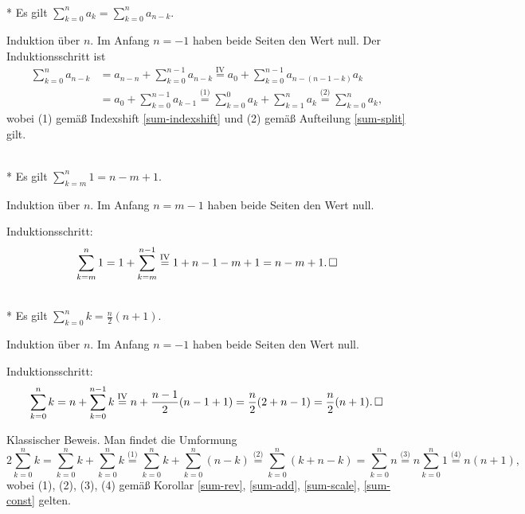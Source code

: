 \begin{Korollar}\label{sum-rev}\mbox{}\\*
Es gilt $\sum_{k=0}^n a_k = \sum_{k=0}^n a_{n-k}$.
\end{Korollar}
\begin{Beweis}
Induktion über $n$. Im Anfang $n=-1$ haben beide Seiten den
Wert null. Der Induktionsschritt ist
\begin{align*}
\sum_{k=0}^n a_{n-k} &= a_{n-n} + \sum_{k=0}^{n-1} a_{n-k}
\stackrel{\mathrm{IV}}= a_0+\sum_{k=0}^{n-1} a_{n-(n-1-k)}a_k\\
&= a_0+\sum_{k=0}^{n-1} a_{k-1}
\stackrel{\text{(1)}}= \sum_{k=0}^0 a_k+\sum_{k=1}^n a_k
\stackrel{\text{(2)}}= \sum_{k=0}^n a_k,
\end{align*}
wobei (1) gemäß Indexshift \ref{sum-indexshift} und
(2) gemäß Aufteilung \ref{sum-split} gilt.\,\qedsymbol
\end{Beweis}

\begin{Korollar}%
\label{sum-const}\mbox{}\\*
Es gilt $\sum_{k=m}^n 1 = n-m+1$.
\end{Korollar}
\begin{Beweis}
Induktion über $n$. Im Anfang $n=m-1$ haben beide Seiten
den Wert null.

Induktionsschritt:
\[\sum_{k=m}^n 1 = 1 + \sum_{k=m}^{n-1}
\stackrel{\mathrm{IV}}= 1 + n-1-m+1 = n-m+1.\,\square\]
\end{Beweis}

\begin{Satz}\mbox{}\\*
Es gilt $\sum_{k=0}^n k = \frac{n}{2}(n+1)$.
\end{Satz}
\begin{Beweis}[Beweis 1]
Induktion über $n$. Im Anfang $n=-1$ haben beide Seiten den Wert null.

Induktionsschritt:
\[\sum_{k=0}^n k = n + \sum_{k=0}^{n-1} k
\stackrel{\mathrm{IV}}= n + \frac{n-1}{2}(n-1+1)
= \frac{n}{2}(2 + n-1) = \frac{n}{2}(n+1).\,\square\]
\end{Beweis}
\begin{Beweis}[Beweis 2]
Klassischer Beweis. Man findet die Umformung
\[2\sum_{k=0}^n k = \!\sum_{k=0}^n k + \!\sum_{k=0}^n k
\stackrel{\text{(1)}}= \!\sum_{k=0}^n k + \!\sum_{k=0}^n (n-k)
\stackrel{\text{(2)}}= \!\sum_{k=0}^n (k+n-k)
= \!\sum_{k=0}^n n \stackrel{\text{(3)}}= n\!\sum_{k=0}^n 1
\stackrel{\text{(4)}}= n(n+1),\]
wobei (1), (2), (3), (4) gemäß Korollar
\ref{sum-rev}, \ref{sum-add}, \ref{sum-scale}, \ref{sum-const}
gelten.\,\qedsymbol
\end{Beweis}


